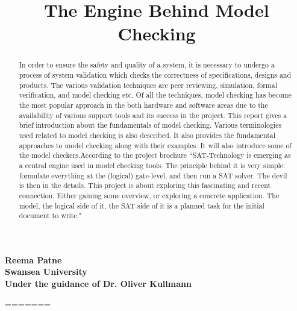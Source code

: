 \documentclass{article}
\begin{document}
\title{ The Engine Behind Model Checking}
\maketitle
\begin{center}
\textbf{Reema Patne \\ Swansea University \\ Under the guidance of Dr. Oliver Kullmann }

\end{center}
\begin{abstract}
In order to ensure the safety and quality of a system, it is necessary to undergo a process of system validation which checks the correctness of specifications, designs and products. The various validation techniques are peer reviewing, simulation, formal verification, and model checking etc. Of all the techniques, model checking has become the most popular approach in the both hardware and software areas due to the availability of various support tools and its success in the project. This report gives a brief introduction about the fundamentals of model checking. Various terminologies used related to model checking is also described. It also provides the fundamental approaches to model checking along with their examples. It will also introduce some of the model checkers.According to the project brochure ``SAT-Technology is emerging as a central engine used in model checking tools. The principle behind it is very simple: formulate everything at the (logical) gate-level, and then run a SAT solver. The devil is then in the details. This project is about exploring this fascinating and recent connection. Either gaining some overview, or exploring a concrete application. The model, the logical side of it, the SAT side of it is a planned task for the initial document to write."\cite{Berardetall2001}


\end{abstract}

\newpage
=======

\usepackage{a4}
\usepackage{graphicx}
\end{document}
